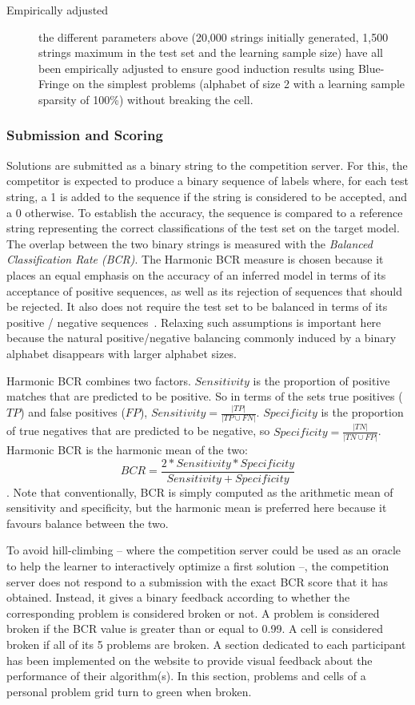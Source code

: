 \begin{description}
\item[Empirically adjusted] the different parameters above (20,000 strings initially generated, 1,500 strings maximum in the test set and the learning sample size) have all been empirically adjusted to ensure good induction results using Blue-Fringe on the simplest problems (alphabet of size 2 with a learning sample sparsity of 100\%) without breaking the cell.

\end{description}

\subsubsection{Submission and Scoring}

Solutions are submitted as a binary string to the competition server. For this, the competitor is expected to produce a binary sequence of labels where, for each test string, a 1 is added to the sequence if the string is considered to be accepted, and a 0 otherwise. To establish the accuracy, the sequence is compared to a reference string representing the correct classifications of the test set on the target model. The overlap between the two binary strings is measured with the \emph{Balanced Classification Rate (BCR)}. The Harmonic BCR measure is chosen because it places an equal emphasis on the accuracy of an inferred model in terms of its acceptance of positive sequences, as well as its rejection of sequences that should be rejected. It also does not require the test set to be balanced in terms of its positive / negative sequences~\cite{Walkinshaw2008}. Relaxing such assumptions is important here because the natural positive/negative balancing commonly induced by a binary alphabet disappears with larger alphabet sizes.

Harmonic BCR combines two factors. $Sensitivity$ is the proportion of positive matches that are predicted to be positive. So in terms of the sets true positives ($TP$) and false positives ($FP$), $Sensitivity=\frac{|TP|}{|TP \cup FN|}$. $Specificity$ is the proportion of true negatives that are predicted to be negative, so $Specificity=\frac{|TN|}{|TN \cup FP|}$. Harmonic BCR is the harmonic mean of the two: $$BCR=\frac{2*Sensitivity*Specificity}{Sensitivity + Specificity}$$. Note that conventionally, BCR is simply computed as the arithmetic mean of sensitivity and specificity, but the harmonic mean is preferred here because it favours balance between the two.

To avoid hill-climbing -- where the competition server could be used as an oracle to help the learner to interactively optimize a first solution --, the competition server does not respond to a submission with the exact BCR score that it has obtained. Instead, it gives a binary feedback according to whether the corresponding problem is considered broken or not. A problem is considered broken if the BCR value is greater than or equal to 0.99. A cell is considered broken if all of its 5 problems are broken. A section dedicated to each participant has been implemented on the website to provide visual feedback about the performance of their algorithm(s). In this section, problems and cells of a personal problem grid turn to green when broken.


